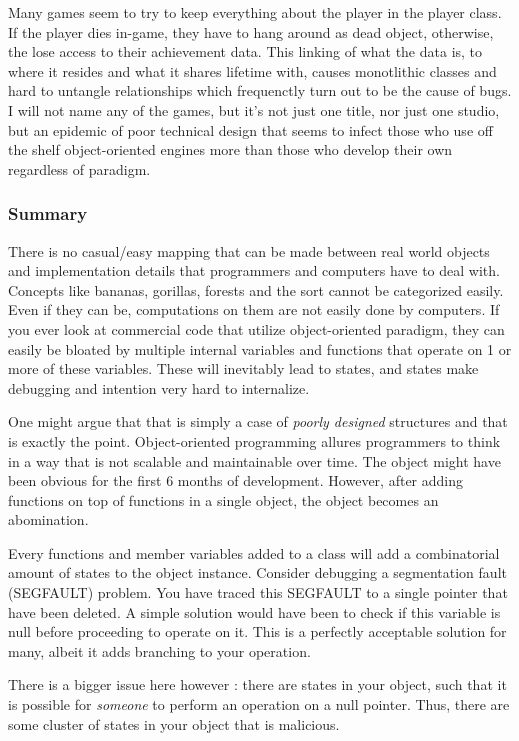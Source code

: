 \documentclass[a4paper,12pt]{article}
\begin{document}
Many games seem to try to keep everything about the player in the player class.
If the player dies in-game, they have to hang around as dead object, otherwise, the lose access to their achievement data.
This linking of what the data is, to where it resides and what it shares lifetime with, causes monotlithic classes and hard to untangle relationships which frequenctly turn out to be the cause of bugs.
I will not name any of the games, but it's not just one title, nor just one studio, but an epidemic of poor technical design that seems to infect those who use off the shelf object-oriented engines more than those who develop their own regardless of paradigm.

\subsubsection{Summary}

There is no casual/easy mapping that can be made between real world objects and implementation details that programmers and computers have to deal with.
Concepts like bananas, gorillas, forests and the sort cannot be categorized easily.
Even if they can be, computations on them are not easily done by computers.
If you ever look at commercial code that utilize object-oriented paradigm, they can easily be bloated by multiple internal variables and functions that operate on 1 or more of these variables.
These will inevitably lead to states, and states make debugging and intention very hard to internalize.

One might argue that that is simply a case of \textit{poorly designed} structures and that is exactly the point.
Object-oriented programming allures programmers to think in a way that is not scalable and maintainable over time.
The object might have been obvious for the first 6 months of development.
However, after adding functions on top of functions in a single object, the object becomes an abomination.

Every functions and member variables added to a class will add a combinatorial amount of states to the object instance.
Consider debugging a segmentation fault (SEGFAULT) problem.
You have traced this SEGFAULT to a single pointer that have been deleted.
A simple solution would have been to check if this variable is null before proceeding to operate on it.
This is a perfectly acceptable solution for many, albeit it adds branching to your operation.

There is a bigger issue here however : there are states in your object, such that it is possible for \textit{someone} to perform an operation on a null pointer.
Thus, there are some cluster of states in your object that is malicious.
\end{document}
